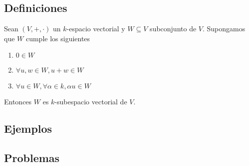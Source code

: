 \subsection*{Definiciones}
Sean \( (V, +, \cdot) \) un \( k \)-espacio vectorial y \( W \subseteq V \) subconjunto de \( V \). Supongamos que \( W \) cumple los siguientes

\begin{enumerate}
    \item \( 0 \in W \)
    \item \( \forall u, w \in W, u + w \in W \)
    \item \( \forall u \in W, \forall \alpha \in k, \alpha u \in W \)
\end{enumerate}
Entonces \( W \) es \( k \)-subespacio vectorial de \( V \).


\subsection*{Ejemplos}

\subsection*{Problemas}